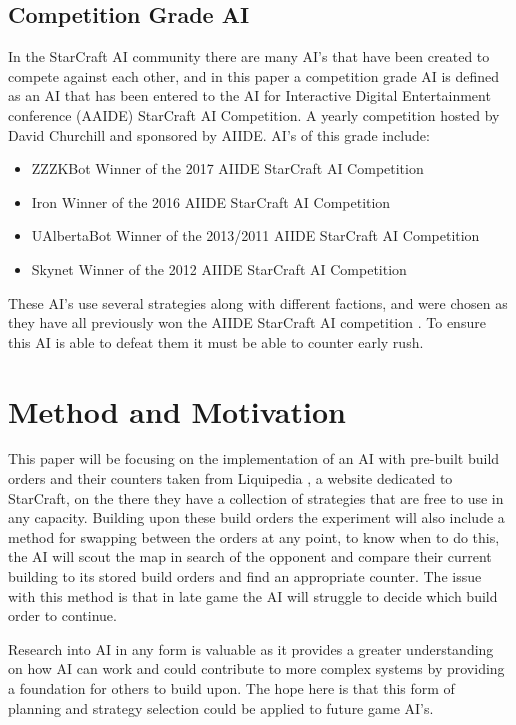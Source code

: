\documentclass[journal]{IEEEtran}
\begin{document}
\subsection{Competition Grade AI}
In the StarCraft AI community there are many AI's that have been created to compete against each other, and in this paper a competition grade AI is defined as an AI that has been entered to the AI for Interactive Digital Entertainment conference (AAIDE) StarCraft AI Competition. A yearly competition hosted by David Churchill and sponsored by AIIDE. AI's of this grade include:
\begin{itemize}
	\item ZZZKBot Winner of the 2017 AIIDE StarCraft AI Competition \cite{ZZZK}
	\item Iron Winner of the 2016 AIIDE StarCraft AI Competition \cite{Iron}
	\item UAlbertaBot Winner of the 2013/2011 AIIDE StarCraft AI Competition \cite{UAlbertaBotBot}
	\item Skynet Winner of the 2012 AIIDE StarCraft AI Competition \cite{Skynet}
\end{itemize}

These AI's use several strategies along with different factions, and were chosen as they have all previously won the AIIDE StarCraft AI competition \cite{Results}. To ensure this AI is able to defeat them it must be able to counter early rush.

\section{Method and Motivation}
This paper will be focusing on the implementation of an AI with pre-built build orders and their counters taken from Liquipedia \cite{Liquid}, a website dedicated to StarCraft, on the there they have a collection of strategies that are free to use in any capacity. Building upon these build orders the experiment will also include a method for swapping between the orders at any point, to know when to do this, the AI will scout the map in search of the opponent and compare their current building to its stored build orders and find an appropriate counter. The issue with this method is that in late game the AI will struggle to decide which build order to continue. 

Research into AI in any form is valuable as it provides a greater understanding on how AI can work and could contribute to more complex systems by providing a foundation for others to build upon. The hope here is that this form of planning and strategy selection could be applied to future game AI's.
\end{document}
